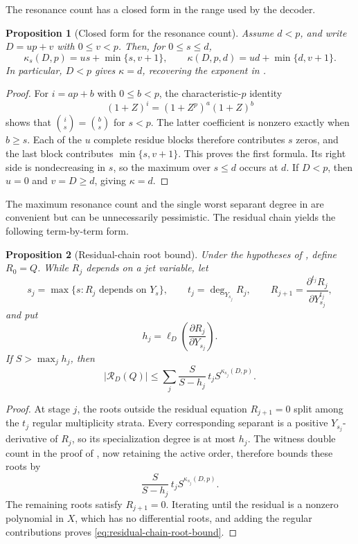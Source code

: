 \documentclass[11pt,letterpaper]{article}
\newtheorem{proposition}[proposition]{Proposition}
\theoremstyle{definition}
\begin{document}
The resonance count has a closed form in the range used by the decoder.

\begin{proposition}[Closed form for the resonance count]
\label{prop:resonance-closed-form}
Assume \(d<p\), and write \(D=up+v\) with \(0\leq v<p\).  Then, for
\(0\leq s\leq d\),
\begin{equation}
  \kappa_s(D,p)=us+\min\{s,v+1\},
  \qquad
  \kappa(D,p,d)=ud+\min\{d,v+1\}.
  \label{eq:resonance-closed-form}
\end{equation}
In particular, \(D<p\) gives \(\kappa=d\), recovering the exponent in
.
\end{proposition}

\begin{proof}
For \(i=ap+b\) with \(0\leq b<p\), the characteristic-\(p\) identity
\[
  (1+Z)^i=(1+Z^p)^a(1+Z)^b
\]
shows that \(\binom is=\binom bs\) for \(s<p\).  The latter coefficient is
nonzero exactly when \(b\geq s\).  Each of the \(u\) complete residue
blocks therefore contributes \(s\) zeros, and the last block contributes
\(\min\{s,v+1\}\).  This proves the first formula.  Its right side is
nondecreasing in \(s\), so the maximum over \(s\leq d\) occurs at \(d\).
If \(D<p\), then \(u=0\) and \(v=D\geq d\), giving \(\kappa=d\).
\end{proof}

The maximum resonance count and the single worst separant degree in
 are convenient but can be unnecessarily
pessimistic.  The residual chain yields the following term-by-term form.

\begin{proposition}[Residual-chain root bound]
\label{prop:residual-chain-root-bound}
Under the hypotheses of , define
\(R_0=Q\).  While \(R_j\) depends on a jet variable, let
\[
  s_j=\max\{s:R_j\text{ depends on }Y_s\},
  \qquad
  t_j=\deg_{Y_{s_j}}R_j,
  \qquad
  R_{j+1}=
  \frac{\partial^{t_j}R_j}{\partial Y_{s_j}^{t_j}},
\]
and put
\[
  h_j=
  \ell_D\!\left(\frac{\partial R_j}{\partial Y_{s_j}}\right).
\]
If \(S>\max_jh_j\), then
\begin{equation}
  |\mathcal R_D(Q)|
  \leq
  \sum_j
  \frac{S}{S-h_j}\,
  t_jS^{\kappa_{s_j}(D,p)}.
  \label{eq:residual-chain-root-bound}
\end{equation}
\end{proposition}

\begin{proof}
At stage \(j\), the roots outside the residual equation \(R_{j+1}=0\)
split among the \(t_j\) regular multiplicity strata.  Every corresponding
separant is a positive \(Y_{s_j}\)-derivative of \(R_j\), so its
specialization degree is at most \(h_j\).  The witness double count in the
proof of , now retaining the active order,
therefore bounds these roots by
\[
  \frac{S}{S-h_j}\,t_jS^{\kappa_{s_j}(D,p)}.
\]
The remaining roots satisfy \(R_{j+1}=0\).  Iterating until the residual is
a nonzero polynomial in \(X\), which has no differential roots, and adding
the regular contributions proves \eqref{eq:residual-chain-root-bound}.
\end{proof}
\end{document}
